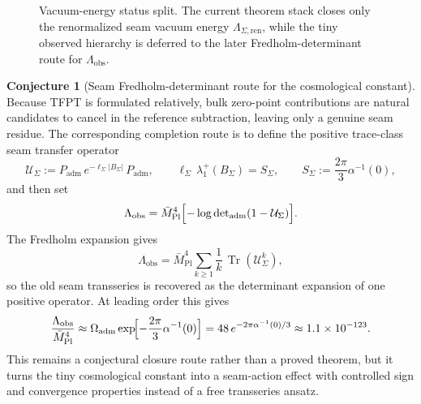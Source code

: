 \documentclass[11pt,a4paper]{article}
\theoremstyle{definition}
\newtheorem{conjecture}[theorem]{Conjecture}
\theoremstyle{remark}
\DeclareMathOperator{\tr}{Tr}
\newcommand{\Seam}{\Sigma}
\newcommand{\Mpl}{\bar M_{\mathrm{Pl}}}
\newcommand{\Padm}{P_{\mathrm{adm}}}
\begin{document}
\begin{figure}[t]
\centering
\scriptsize
{}
\caption{Vacuum-energy status split. The current theorem stack closes only the renormalized seam vacuum energy $\Lambda_{\Seam,\mathrm{ren}}$, while the tiny observed hierarchy is deferred to the later Fredholm-determinant route for $\Lambda_{\mathrm{obs}}$.}
\label{fig:vacuum-energy-status}
\end{figure}

\begin{conjecture}[Seam Fredholm-determinant route for the cosmological constant]
Because TFPT is formulated relatively, bulk zero-point contributions are natural
candidates to cancel in the reference subtraction, leaving only a genuine seam
residue. The corresponding completion route is to define the positive trace-class
seam transfer operator
\[
\mathcal U_\Seam
:=
\Padm\,e^{-\ell_\Seam |B_\Seam|}\,\Padm,
\qquad
\ell_\Seam\,\lambda_1^+(B_\Seam)=S_\Seam,
\qquad
S_\Seam:=\frac{2\pi}{3}\alpha^{-1}(0),
\]
and then set
\[
\Lambda_{\mathrm{obs}}
=
\Mpl^4\Bigl[-\log\det\nolimits_{\mathrm{adm}}(1-\mathcal U_\Seam)\Bigr].
\]
The Fredholm expansion gives
\[
\Lambda_{\mathrm{obs}}
=
\Mpl^4\sum_{k\ge1}\frac{1}{k}\,\tr(\mathcal U_\Seam^k),
\]
so the old seam transseries is recovered as the determinant expansion of one
positive operator. At leading order this gives
\[
\frac{\Lambda_{\mathrm{obs}}}{\Mpl^4}
\approx
\Omega_{\mathrm{adm}}\exp\!\Bigl[-\frac{2\pi}{3}\alpha^{-1}(0)\Bigr]
=
48\,e^{-2\pi\alpha^{-1}(0)/3}
\approx
1.1\times10^{-123}.
\]
This remains a conjectural closure route rather than a proved theorem, but it
turns the tiny cosmological constant into a seam-action effect with controlled
sign and convergence properties instead of a free transseries ansatz.
\end{conjecture}
\end{document}
